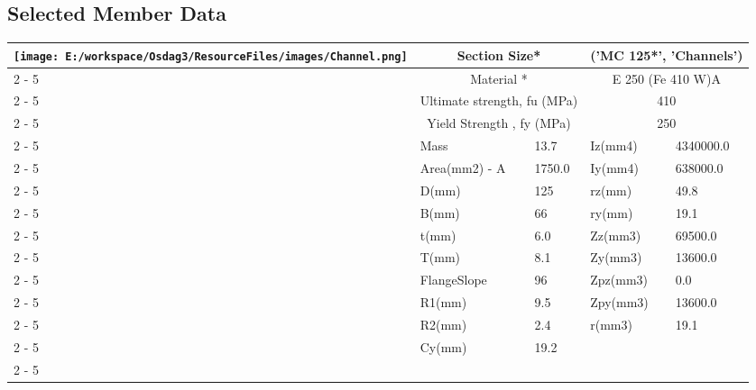 \documentclass{article}%
\begin{document}
\subsection{Selected Member Data}%
\label{subsec:SelectedMemberData}%
\renewcommand{\arraystretch}{1.2}%
\begin{longtable}{|p{5cm}|p{2cm}|p{2cm}|p{2cm}|p{5cm}|}%
\hline%
\hline%
\multirow{14}{*}{\texttt{[image: E:/workspace/Osdag3/ResourceFiles/images/Channel.png]}}&\multicolumn{2}{|c|}{Section Size*}&\multicolumn{2}{|c|}{('MC 125*', 'Channels')}\\%
\cline{2%
-%
5}%
&\multicolumn{2}{|c|}{Material *}&\multicolumn{2}{|c|}{E 250 (Fe 410 W)A}\\%
\cline{2%
-%
5}%
&\multicolumn{2}{|c|}{Ultimate strength, fu (MPa)}&\multicolumn{2}{|c|}{410}\\%
\cline{2%
-%
5}%
&\multicolumn{2}{|c|}{Yield Strength , fy (MPa)}&\multicolumn{2}{|c|}{250}\\%
\cline{2%
-%
5}%
&Mass&13.7&Iz(mm4)&4340000.0\\%
\cline{2%
-%
5}%
&Area(mm2) {-} A&1750.0&Iy(mm4)&638000.0\\%
\cline{2%
-%
5}%
&D(mm)&125&rz(mm)&49.8\\%
\cline{2%
-%
5}%
&B(mm)&66&ry(mm)&19.1\\%
\cline{2%
-%
5}%
&t(mm)&6.0&Zz(mm3)&69500.0\\%
\cline{2%
-%
5}%
&T(mm)&8.1&Zy(mm3)&13600.0\\%
\cline{2%
-%
5}%
&FlangeSlope&96&Zpz(mm3)&0.0\\%
\cline{2%
-%
5}%
&R1(mm)&9.5&Zpy(mm3)&13600.0\\%
\cline{2%
-%
5}%
&R2(mm)&2.4&r(mm3)&19.1\\%
\cline{2%
-%
5}%
&Cy(mm)&19.2&&\\%
\cline{2%
-%
5}%
\hline%
\end{longtable}

%
\newpage%
\end{document}
